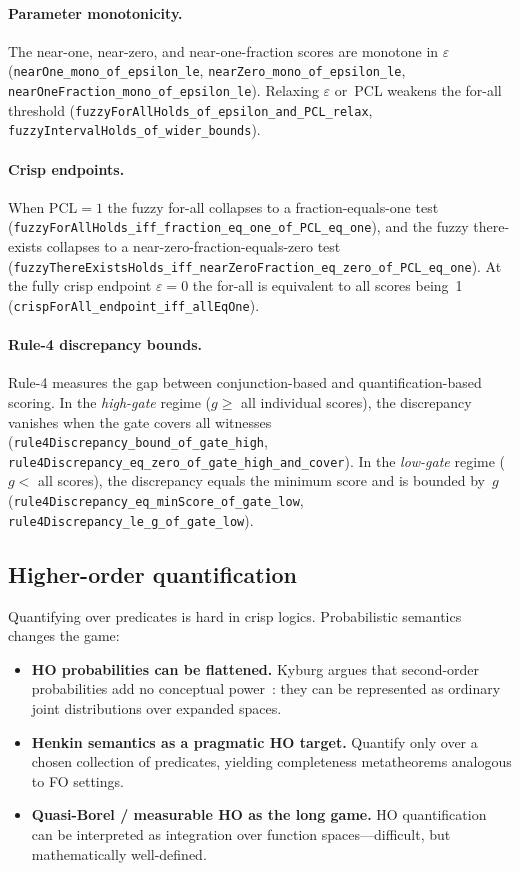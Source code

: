 \documentclass[]{article}
\newcommand{\code}[1]{\texttt{#1}}
\begin{document}
\paragraph{Parameter monotonicity.}
The near-one, near-zero, and near-one-fraction scores are monotone in
$\varepsilon$ (\code{nearOne\_mono\_of\_epsilon\_le},
\code{nearZero\_mono\_of\_epsilon\_le},
\code{nearOneFraction\_mono\_of\_epsilon\_le}).  Relaxing $\varepsilon$
or~PCL weakens the for-all threshold
(\code{fuzzyForAllHolds\_of\_epsilon\_and\_PCL\_relax},
\code{fuzzyIntervalHolds\_of\_wider\_bounds}).

\paragraph{Crisp endpoints.}
When $\mathrm{PCL}=1$ the fuzzy for-all collapses to a fraction-equals-one
test (\code{fuzzyForAllHolds\_iff\_fraction\_eq\_one\_of\_PCL\_eq\_one}),
and the fuzzy there-exists collapses to a near-zero-fraction-equals-zero
test (\code{fuzzyThereExistsHolds\_iff\_nearZeroFraction\_eq\_zero\_of\_PCL\_eq\_one}).
At the fully crisp endpoint $\varepsilon=0$ the for-all is equivalent to
all scores being~1 (\code{crispForAll\_endpoint\_iff\_allEqOne}).

\paragraph{Rule-4 discrepancy bounds.}
Rule-4 measures the gap between conjunction-based and quantification-based
scoring.  In the \emph{high-gate} regime
($g\ge$ all individual scores), the discrepancy vanishes when the gate
covers all witnesses
(\code{rule4Discrepancy\_bound\_of\_gate\_high},
\code{rule4Discrepancy\_eq\_zero\_of\_gate\_high\_and\_cover}).
In the \emph{low-gate} regime ($g<$ all scores), the discrepancy
equals the minimum score and is bounded by~$g$
(\code{rule4Discrepancy\_eq\_minScore\_of\_gate\_low},
\code{rule4Discrepancy\_le\_g\_of\_gate\_low}).


\subsection{Higher-order quantification}

Quantifying over predicates is hard in crisp logics.
Probabilistic semantics changes the game:

\begin{itemize}[leftmargin=2em]
\item \textbf{HO probabilities can be flattened.}
Kyburg argues that second-order probabilities add no conceptual
power~\cite{Kyburg1988}: they can be represented as ordinary joint
distributions over expanded spaces.
\item \textbf{Henkin semantics as a pragmatic HO target.}
Quantify only over a chosen collection of predicates, yielding
completeness metatheorems analogous to FO settings.
\item \textbf{Quasi-Borel / measurable HO as the long game.}
HO quantification can be interpreted as integration over function
spaces---difficult, but mathematically well-defined.
\end{itemize}
\end{document}
